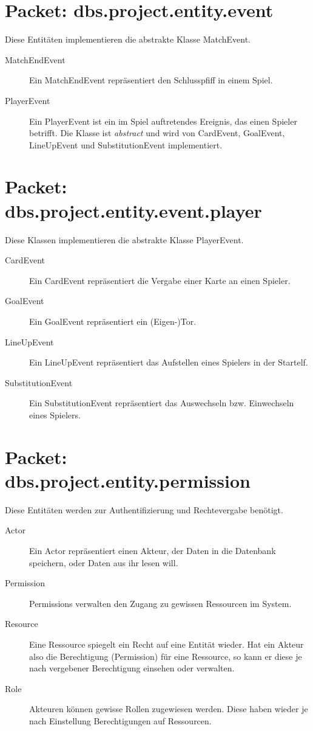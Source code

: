 \documentclass[11pt,german]{scrartcl}
\begin{document}
\section{Packet: dbs.project.entity.event}
Diese Entitäten implementieren die abstrakte Klasse MatchEvent.

\begin{description}

\item [MatchEndEvent]
Ein MatchEndEvent repräsentiert den Schlusspfiff in einem Spiel.

\item [PlayerEvent]
Ein PlayerEvent ist ein im Spiel auftretendes Ereignis, das einen Spieler betrifft. Die Klasse ist {\it abstract} und wird von CardEvent, GoalEvent, LineUpEvent und SubstitutionEvent implementiert.

\end{description}

\section{Packet: dbs.project.entity.event.player}
Diese Klassen implementieren die abstrakte Klasse PlayerEvent.

\begin{description}
\item [CardEvent]
Ein CardEvent repräsentiert die Vergabe einer Karte an einen Spieler.

\item [GoalEvent]
Ein GoalEvent repräsentiert ein (Eigen-)Tor.

\item [LineUpEvent]
Ein LineUpEvent repräsentiert das Aufstellen eines Spielers in der Startelf.

\item [SubstitutionEvent]
Ein SubstitutionEvent repräsentiert das Auswechseln bzw. Einwechseln eines Spielers.
\end{description}

\section{Packet: dbs.project.entity.permission}
Diese Entitäten werden zur Authentifizierung und Rechtevergabe benötigt.

\begin{description}
\item [Actor]
Ein Actor repräsentiert einen Akteur, der Daten in die Datenbank speichern, oder Daten aus ihr lesen will.

\item [Permission]
Permissions verwalten den Zugang zu gewissen Ressourcen im System.

\item [Resource]
Eine Ressource spiegelt ein Recht auf eine Entität wieder. Hat ein Akteur also die Berechtigung (Permission) für eine Ressource, so kann er diese je nach vergebener Berechtigung einsehen oder verwalten.

\item [Role]
Akteuren können gewisse Rollen zugewiesen werden. Diese haben wieder je nach Einstellung Berechtigungen auf Ressourcen.
\end{description}
\end{document}
